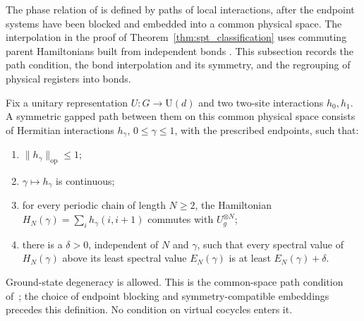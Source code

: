 The phase relation of \cite[Sections~II.C.1--2]{Schuch2011Phases} is defined by
paths of local interactions, after the endpoint systems have been blocked and
embedded into a common physical space.  The interpolation in the proof of
Theorem~\ref{thm:spt_classification} uses commuting parent Hamiltonians built
from independent bonds \cite[Sections~II.D.2 and~II.F.2]{Schuch2011Phases}.  This
subsection records the path condition, the bond interpolation and its symmetry,
and the regrouping of physical registers into bonds.

\begin{definition}
    \label{def:spt_common_space_gapped_path}
    \leanok
    Fix a unitary representation $U:G\to\mathrm U(d)$ and two
    two-site interactions $h_0,h_1$.  A symmetric gapped path between them
    on this common physical space consists of Hermitian interactions
    $h_\gamma$, $0\le\gamma\le1$, with the prescribed endpoints, such that:
    \begin{enumerate}
        \item $\|h_\gamma\|_{\mathrm{op}}\le1$;
        \item $\gamma\mapsto h_\gamma$ is continuous;
        \item for every periodic chain of length $N\ge2$, the Hamiltonian
              $H_N(\gamma)=\sum_i h_\gamma(i,i+1)$ commutes with $U_g^{\otimes N}$;
        \item there is a $\delta>0$, independent of $N$ and $\gamma$, such
              that every spectral value of $H_N(\gamma)$ above its least spectral
              value $E_N(\gamma)$ is at least $E_N(\gamma)+\delta$.
    \end{enumerate}
    Ground-state degeneracy is allowed.  This is the common-space path
    condition of~\cite[Sections~II.C.1--2, lines~407--453]{Schuch2011Phases};
    the choice of endpoint blocking and symmetry-compatible embeddings precedes
    this definition.  No condition on virtual cocycles enters it.
\end{definition}

